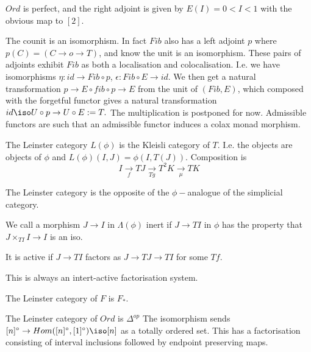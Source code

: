 \begin{example}
    $Ord$ is perfect, and the right adjoint is given by $E(I)=0<I<1$ with the obvious map to $[2].$
\end{example}


The counit is an isomorphism. In fact $Fib$ also has a left adjoint $p$ where $p(C)=(C\rightarrow o\rightarrow T)$, and know the unit is an isomorphism. These pairs of adjoints exhibit $Fib$ as both a localisation and colocalisation. I.e. we have isomorphisms $\eta:id\rightarrow Fib\circ p$, $\epsilon: Fib\circ E \rightarrow id.$ We then get a natural transformation $p\rightarrow E\circ fib \circ p \rightarrow E$ from the unit of $(Fib,E)$, which composed with the forgetful functor gives a natural transformation $id\iso U\circ p\rightarrow U\circ E := T.$  The multiplication is postponed for now. Admissible functors are such that an admissible functor induces a colax monad morphism.

\begin{definition}
    The Leinster category $L(\phi)$ is the Kleisli category of $T$. I.e. the objects are objects of $\phi$ and $L(\phi)(I,J)=\phi(I,T(J)).$ Composition is $$I\xrightarrow[f]{} TJ\xrightarrow[Tg]{}T^2K\xrightarrow[\mu]{}TK$$
\end{definition}

The Leinster category is the opposite of the $\phi-$analogue of the simplicial category.

\begin{remark}
    We call a morphism $J\rightarrow I$ in $\Lambda(\phi)$ inert if $J\rightarrow TI$ in $\phi$ has the property that $J\times_{TI} I\rightarrow I$ is an iso.

    It is active if $J\rightarrow TI$ factors as $J\rightarrow TJ\rightarrow TI$ for some $Tf.$

    This is always an intert-active factorisation system.
\end{remark}

\begin{example}
    The Leinster category of $F$ is $F_*.$
\end{example}

\begin{example}
    The Leinster category of $Ord$ is $\Delta^{op}$ The isomorphism sends $[n]^\circ \rightarrow Hom([n]^\circ,[1]^\circ)\iso [n]$ as a totally ordered set. This has a factorisation consisting of interval inclusions followed by endpoint preserving maps.
\end{example}

